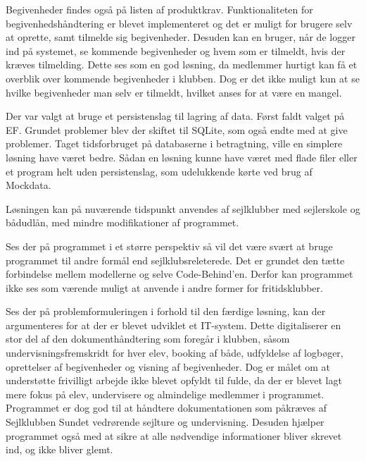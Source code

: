 Begivenheder findes også på listen af produktkrav.
Funktionaliteten for begivenhedshåndtering er blevet implementeret og det er muligt for brugere selv at oprette, samt tilmelde sig begivenheder.
Desuden kan en bruger, når de logger ind på systemet, se kommende begivenheder og hvem som er tilmeldt, hvis der kræves tilmelding. 
Dette ses som en god løsning, da medlemmer hurtigt kan få et overblik over kommende begivenheder i klubben.
Dog er det ikke muligt kun at se hvilke begivenheder man selv er tilmeldt, hvilket anses for at være en mangel. 

Der var valgt at bruge et persistenslag til lagring af data. 
Først faldt valget på \acl{EF}. 
Grundet problemer blev der skiftet til SQLite, som også endte med at give problemer. 
Taget tidsforbruget på databaserne i betragtning, ville en simplere løsning have været bedre.
Sådan en løsning kunne have været med flade filer eller et program helt uden persistenslag, som udelukkende kørte ved brug af Mockdata.  

Løsningen kan på nuværende tidspunkt anvendes af sejlklubber med sejlerskole og bådudlån, med mindre modifikationer af programmet. 

Ses der på programmet i et større perspektiv så vil det være svært at bruge programmet til andre formål end sejlklubsreleterede. 
Det er grundet den tætte forbindelse mellem modellerne og selve Code-Behind'en. 
Derfor kan programmet ikke ses som værende muligt at anvende i andre former for fritidsklubber. 


Ses der på problemformuleringen i forhold til den færdige løsning, kan der argumenteres for at der er blevet udviklet et IT-system. 
Dette digitaliserer en stor del af den dokumenthåndtering som foregår i klubben, såsom undervisningsfremskridt for hver elev, booking af både, udfyldelse af logbøger, oprettelser af begivenheder og visning af begivenheder.
Dog er målet om at understøtte frivilligt arbejde ikke blevet opfyldt til fulde, da der er blevet lagt mere fokus på elev, undervisere og almindelige medlemmer i programmet. 
Programmet er dog god til at håndtere dokumentationen som påkræves af Sejlklubben Sundet vedrørende sejlture og undervisning.
Desuden hjælper programmet også med at sikre at alle nødvendige informationer bliver skrevet ind, og ikke bliver glemt.

